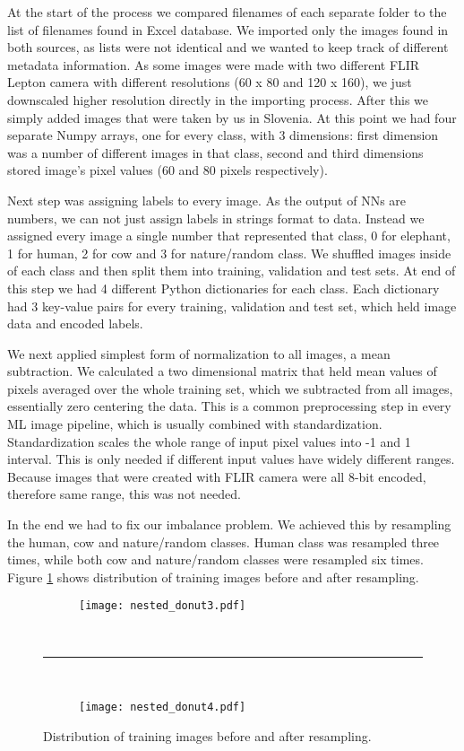 At the start of the process we compared filenames of each separate folder to the list of filenames found in Excel database.
We imported only the images found in both sources, as lists were not identical and we wanted to keep track of different metadata information.
As some images were made with two different FLIR Lepton camera with different resolutions (60 x 80 and 120 x 160), we just downscaled higher resolution directly in the importing process.
After this we simply added images that were taken by us in Slovenia.
At this point we had four separate Numpy arrays, one for every class, with 3 dimensions: first dimension was a number of different images in that class, second and third dimensions stored image's pixel values (60 and 80 pixels respectively).

Next step was assigning labels to every image.
As the output of NNs are numbers, we can not just assign labels in strings format to data.
Instead we assigned every image a single number that represented that class, 0 for elephant, 1 for human, 2 for cow and 3 for nature/random class.
We shuffled images inside of each class and then split them into training, validation and test sets.
At end of this step we had 4 different Python dictionaries for each class.
Each dictionary had 3 key-value pairs for every training, validation and test set, which held image data and encoded labels.

We next applied simplest form of normalization to all images, a mean subtraction.
We calculated a two dimensional matrix that held mean values of pixels averaged over the whole training set, which we subtracted from all images, essentially zero centering the data.
This is a common preprocessing step in every ML image pipeline, which is usually combined with standardization\cite{cs231n}.
Standardization scales the whole range of input pixel values into -1 and 1 interval.
This is only needed if different input values have widely different ranges\cite{cs231n}.
Because images that were created with FLIR camera were all 8-bit encoded, therefore same range, this was not needed.

In the end we had to fix our imbalance problem.
We achieved this by resampling the human, cow and nature/random classes.
Human class was resampled three times, while both cow and nature/random classes were resampled six times.
Figure \ref{resampled} shows distribution of training images before and after resampling.

\begin{figure}[ht] 
    \begin{subfigure}[b]{1\textwidth}
        \centering
        \texttt{[image: nested\_donut3.pdf]} 
    \end{subfigure}
    \unskip\ \hrule\ 
    \begin{subfigure}[b]{1\textwidth}
        \centering
        \texttt{[image: nested\_donut4.pdf]} 
    \end{subfigure}
    
    \caption{ Distribution of training images before and after resampling.}
    \label{resampled}
\end{figure}

